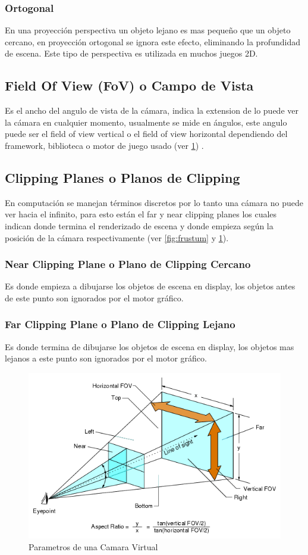 \subsubsection{Ortogonal}
En una proyección perspectiva un objeto lejano es mas pequeño que un objeto cercano, en proyección ortogonal se ignora este efecto, eliminando la profundidad de escena. Este tipo de perspectiva es utilizada en muchos juegos 2D.
\subsection{Field Of View (FoV) o Campo de Vista}
Es el ancho del angulo de vista de la cámara, indica la extension de lo puede ver la cámara en cualquier momento, usualmente se mide en ángulos, este angulo puede ser el field of view vertical o el field of view horizontal dependiendo del framework, biblioteca o motor de juego usado (ver \ref{fig:camera}) \cite{feng_fovy}.
\subsection{Clipping Planes o Planos de Clipping}
En computación se manejan términos discretos por lo tanto una cámara no puede ver hacia el infinito, para esto están el far y near clipping planes los cuales indican donde termina el renderizado de escena y donde empieza según la posición de la cámara respectivamente (ver \ref{fig:frustum} y \ref{fig:camera}).
\subsubsection{Near Clipping Plane o Plano de Clipping Cercano}
Es donde empieza a dibujarse los objetos de escena en display, los objetos antes de este punto son ignorados por el motor gráfico.
\subsubsection{Far Clipping Plane o Plano de Clipping Lejano}
Es donde termina de dibujarse los objetos de escena en display, los objetos mas lejanos a este punto son ignorados por el motor gráfico.
\begin{figure}[H]
\centering
\includegraphics[width=0.9\linewidth]{media/camera.png} 
\caption{Parametros de una Camara Virtual}
\label{fig:camera}
\end{figure}
\newpage
